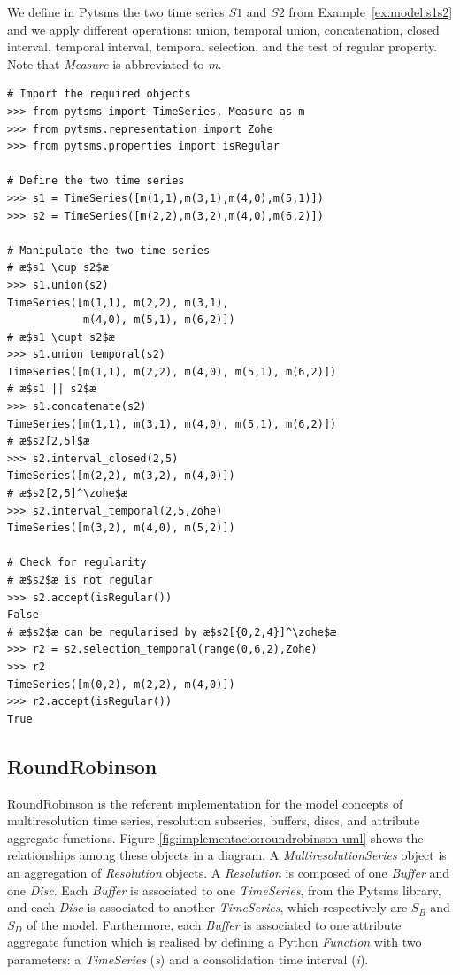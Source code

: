 \begin{example}
  \label{ex:pytsms:example}
  We define in Pytsms the two time series $S1$ and $S2$ from
  Example~\ref{ex:model:s1s2} and we apply different operations:
  union, temporal union, concatenation, closed interval, \zohe{}
  temporal interval, \zohe{} temporal selection, and the test of
  regular property. Note that \emph{Measure} is abbreviated to
  \emph{m}.
{\small
\begin{verbatim}
# Import the required objects
>>> from pytsms import TimeSeries, Measure as m
>>> from pytsms.representation import Zohe
>>> from pytsms.properties import isRegular

# Define the two time series
>>> s1 = TimeSeries([m(1,1),m(3,1),m(4,0),m(5,1)])
>>> s2 = TimeSeries([m(2,2),m(3,2),m(4,0),m(6,2)])

# Manipulate the two time series
# æ$s1 \cup s2$æ
>>> s1.union(s2)
TimeSeries([m(1,1), m(2,2), m(3,1), 
            m(4,0), m(5,1), m(6,2)])
# æ$s1 \cupt s2$æ
>>> s1.union_temporal(s2)
TimeSeries([m(1,1), m(2,2), m(4,0), m(5,1), m(6,2)])
# æ$s1 || s2$æ
>>> s1.concatenate(s2) 
TimeSeries([m(1,1), m(3,1), m(4,0), m(5,1), m(6,2)])
# æ$s2[2,5]$æ
>>> s2.interval_closed(2,5)
TimeSeries([m(2,2), m(3,2), m(4,0)])
# æ$s2[2,5]^\zohe$æ
>>> s2.interval_temporal(2,5,Zohe)
TimeSeries([m(3,2), m(4,0), m(5,2)])

# Check for regularity
# æ$s2$æ is not regular
>>> s2.accept(isRegular())
False
# æ$s2$æ can be regularised by æ$s2[{0,2,4}]^\zohe$æ
>>> r2 = s2.selection_temporal(range(0,6,2),Zohe)
>>> r2
TimeSeries([m(0,2), m(2,2), m(4,0)])
>>> r2.accept(isRegular())
True
\end{verbatim}
}
\end{example}





\subsection{RoundRobinson}


RoundRobinson is the referent implementation for the model concepts of
multiresolution time series, resolution subseries, buffers, discs, and
attribute aggregate functions. Figure
\ref{fig:implementacio:roundrobinson-uml} shows the relationships
among these objects in a  diagram. A
\emph{MultiresolutionSeries} object is an aggregation of
\emph{Resolution} objects. A \emph{Resolution} is composed of one
\emph{Buffer} and one \emph{Disc}. Each \emph{Buffer} is associated to
one \emph{TimeSeries}, from the Pytsms library, and each \emph{Disc}
is associated to another \emph{TimeSeries}, which respectively are
$S_B$ and $S_D$ of the  model. Furthermore, each
\emph{Buffer} is associated to one attribute aggregate function which
is realised by defining a Python \emph{Function} with two parameters:
a \emph{TimeSeries} (\emph{s}) and a consolidation time interval
(\emph{i}).



